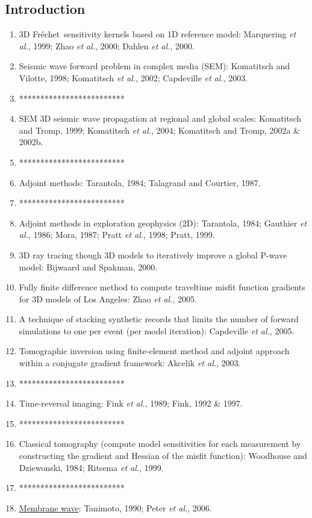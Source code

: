 \documentclass{article}
\newcommand{\sline}{*************************}
\newcommand{\myem}[1]{{\color{red}\uline{#1}}}
\newcommand{\Frechet}{Fr\'{e}chet~}
\newcommand{\etal}{\textit{et al.}}
\begin{document}
\subsection{Introduction}
\begin{enumerate}[\hspace{10mm*}]
  \item 3D \Frechet sensitivity kernels based on 1D reference model: Marquering \etal, 1999; Zhao \etal, 2000; Dahlen \etal, 2000.
  \item Seismic wave forward problem in complex media (SEM): Komatitsch and Vilotte, 1998; Komatitsch \etal, 2002; Capdeville \etal, 2003.
  \item \sline
  \item SEM 3D seismic wave propagation at regional and global scales: Komatitsch and Tromp, 1999; Komatitsch \etal, 2004; Komatitsch and Tromp, 2002a \& 2002b.
  \item \sline
  \item Adjoint methods: Tarantola, 1984; Talagrand and Courtier, 1987.
  \item \sline
  \item Adjoint methods in exploration geophysics (2D): Tarantola, 1984; Gauthier \etal, 1986; Mora, 1987; Pratt \etal, 1998; Pratt, 1999.
  \item 3D ray tracing though 3D models to iteratively improve a global P-wave model: Bijwaard and Spakman, 2000.
  \item Fully finite difference method to compute traveltime misfit function gradients for 3D models of Los Angeles: Zhao \etal, 2005.
  \item A technique of stacking synthetic records that limits the number of forward simulations to one per event (per model iteration): Capdeville \etal, 2005.
  \item Tomographic inversion using finite-element method and adjoint approach within a conjugate gradient framework: Akcelik \etal, 2003.
  \item \sline
  \item Time-reversal imaging: Fink \etal, 1989; Fink, 1992 \& 1997.
  \item \sline
  \item Classical tomography (compute model sensitivities for each measurement by constructing the gradient and Hessian of the misfit function): Woodhouse and Dziewonski, 1984; Ritsema \etal, 1999.
  \item \sline
  \item \myem{Membrane wave}: Tanimoto, 1990; Peter \etal, 2006.

\end{enumerate}
\end{document}
